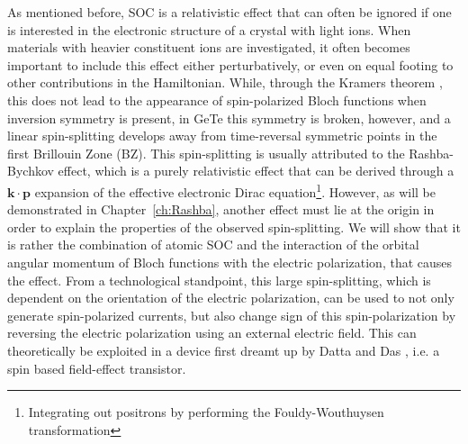 As mentioned before, SOC is a relativistic effect that can often be ignored if one is interested in the electronic structure of a crystal with light ions.
When materials with heavier constituent ions are investigated, it often becomes important to include this effect either perturbatively, or even on equal footing to other contributions in the Hamiltonian.
While, through the Kramers theorem \cite{Kramerstheorem}, this does not lead to the appearance of spin-polarized Bloch functions when inversion symmetry is present, in GeTe this symmetry is broken, however, and a linear spin-splitting develops away from time-reversal symmetric points in the first Brillouin Zone (BZ).
This spin-splitting is usually attributed to the Rashba-Bychkov effect, which is a purely relativistic effect that can be derived through a $\bm{k}\cdot \bm{p}$ expansion of the effective electronic Dirac equation\footnote{Integrating out positrons by performing the Fouldy-Wouthuysen transformation}.
However, as will be demonstrated in Chapter~\ref{ch:Rashba}, another effect must lie at the origin in order to explain the properties of the observed spin-splitting.
We will show that it is rather the combination of atomic SOC and the interaction of the orbital angular momentum of Bloch functions with the electric polarization, that causes the effect.
From a technological standpoint, this large spin-splitting, which is dependent on the orientation of the electric polarization, can be used to not only generate spin-polarized currents, but also change sign of this spin-polarization by reversing the electric polarization using an external electric field.
This can theoretically be exploited in a device first dreamt up by Datta and Das \cite{Datta1990}, i.e. a spin based field-effect transistor.

